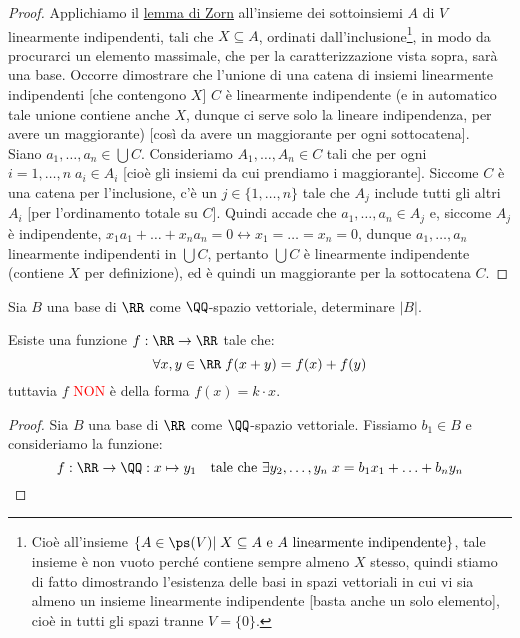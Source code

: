 \documentclass[11pt]{scrartcl}
\begin{document}
\begin{proof}
	Applichiamo il \hyperref[Zorn]{lemma di Zorn} all'insieme dei sottoinsiemi $A$ di $V$ linearmente indipendenti, tali che $X \subseteq A$, ordinati dall'inclusione\footnote{Cioè all'insieme $\{A \in \ps(V) | \; \text{$X \subseteq A$ e $A$ linearmente indipendente}\}$, tale insieme è non vuoto perché contiene
 	sempre almeno $X$ stesso, quindi stiamo di fatto dimostrando l'esistenza delle basi in spazi vettoriali in cui vi sia almeno un insieme linearmente indipendente [basta anche un solo elemento], cioè in tutti gli spazi tranne $V = \{0\}$.}, in modo da procurarci un elemento massimale, che per la caratterizzazione vista sopra, sarà una base.
	Occorre dimostrare che l'unione di una catena di insiemi linearmente indipendenti [che contengono $X$] $C$ è linearmente indipendente (e in automatico tale unione contiene anche $X$, dunque ci serve solo la lineare indipendenza, per avere un maggiorante) [così da avere un maggiorante per ogni sottocatena].\\
	Siano $a_1,\ldots,a_n \in \bigcup C$. Consideriamo $A_1,\ldots,A_n \in C$ tali che per ogni $i = 1,\ldots,n \; a_i \in A_i$ [cioè gli insiemi da cui prendiamo i maggiorante]. Siccome $C$ è una catena per l'inclusione, c'è un $j \in \{1,\ldots,n\}$ tale che $A_j$
	include tutti gli altri $A_i$ [per l'ordinamento totale su $C$]. Quindi accade che $a_1,\ldots,a_n \in A_j$ e, siccome $A_j$ è indipendente, $x_1a_1 + \ldots + x_na_n = 0 \leftrightarrow x_1 = \ldots = x_n = 0$, dunque $a_1,\ldots,a_n$ linearmente indipendenti in $\bigcup C$, pertanto $\bigcup C$ è linearmente indipendente (contiene $X$ per definizione), ed è quindi un maggiorante per la sottocatena $C$.
\end{proof}

\begin{exercise}
	Sia $B$ una base di $\RR$ come $\QQ$-spazio vettoriale, determinare $|B|$.
\end{exercise}

\begin{example}
	Esiste una funzione $f : \RR \rightarrow \RR$ tale che:
	\[ \forall x,y \in \RR \; f(x + y) = f(x) + f(y)
		\]
	tuttavia $f$ \textcolor{red}{NON} è della forma $f(x) = k\cdot x$.
\end{example}

\begin{proof}
	Sia $B$ una base di $\RR$ come $\QQ$-spazio vettoriale. Fissiamo $b_1 \in B$ e consideriamo la funzione:
	\[ f : \RR \rightarrow \QQ : x \mapsto y_1 \quad \text{tale che $\exists y_2,\ldots,y_n \; x = b_1x_1 + \ldots + b_ny_n$}
		\]
\end{proof}
\end{document}
